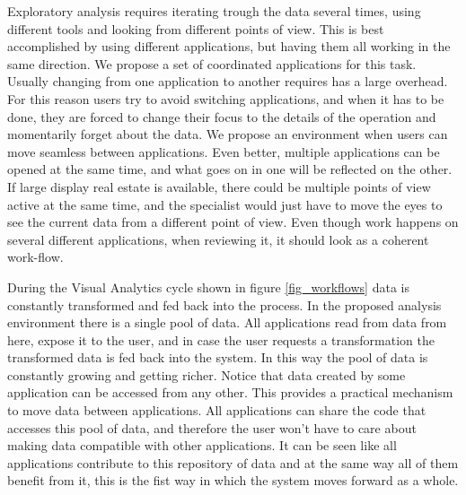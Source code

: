 Exploratory analysis requires iterating trough the data several times, using different tools and looking from different points of view. This is best accomplished by using different applications, but having them all working in the same direction. We propose a set of coordinated applications for this task. Usually changing from one application to another requires has a large overhead. For this reason users try to avoid switching applications, and when it has to be done, they are forced to change their focus to the details of the operation and momentarily forget about the data. We propose an environment when users can move seamless between applications. Even better, multiple applications can be opened at the same time, and what goes on in one will be reflected on the other. If large display real estate is available, there could be multiple points of view active at the same time, and the specialist would just have to move the eyes to see the current data from a different point of view. Even though work happens on several different applications, when reviewing it, it should look as a coherent work-flow. 

During the Visual Analytics cycle shown in figure \ref{fig_workflows} data is constantly transformed and fed back into the process. In the proposed analysis environment there is a single pool of data. All applications read from data from here, expose it to the user, and in case the user requests a transformation the transformed data is fed back into the system. In this way the pool of data is constantly growing and getting richer. Notice that data created by some application can be accessed from any other. This provides a practical mechanism to move data between applications. All applications can share the code that accesses this pool of data, and therefore the user won't have to care about making data compatible with other applications. It can be seen like all applications contribute to this repository of data and at the same way all of them benefit from it, this is the fist way in which the system moves forward as a whole.

